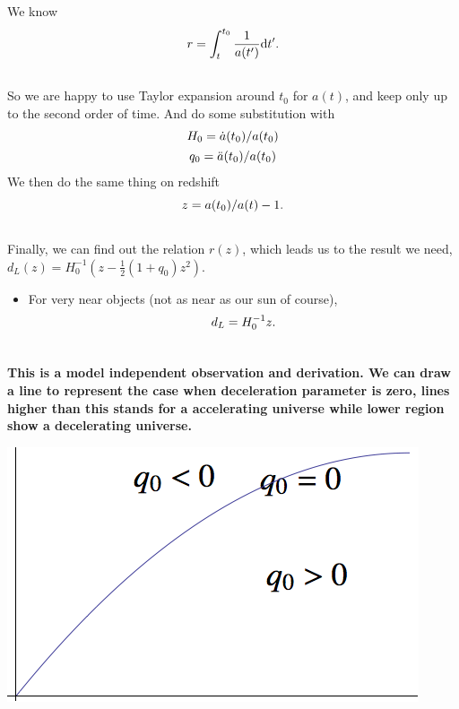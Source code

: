\documentclass[letterpaper,10pt,english]{sphinxmanual}
\begin{document}
We know
\begin{gather}
\begin{split}r = \int_t^{t_0} \frac{1}{a(t')} \mathrm d t' .\end{split}\notag\\\begin{split}\end{split}\notag
\end{gather}
So we are happy to use Taylor expansion around $t_0$ for $a(t)$, and keep only up to the second order of time. And do some substitution with
\begin{gather}
\begin{split}H_0 = \dot a(t_0)/a(t_0)\end{split}\notag\\\begin{split}q_0=\ddot a (t_0) / a(t_0)\end{split}\notag
\end{gather}
We then do the same thing on redshift
\begin{gather}
\begin{split}z=a(t_0)/a(t) - 1 .\end{split}\notag\\\begin{split}\end{split}\notag
\end{gather}
Finally, we can find out the relation $r(z)$, which leads us to the result we need, $d_L(z) = H_0^{-1} (z - \frac12 (1+q_0) z^2)$.
\begin{itemize}
\item {} 
For very near objects (not as near as our sun of course),
\begin{gather}
\begin{split}d_L = H_0^{-1}z .\end{split}\notag\\\begin{split}\end{split}\notag
\end{gather}
\end{itemize}

\textbf{This is a model independent observation and derivation. We can draw a line to represent the case when deceleration parameter is zero, lines higher than this stands for a accelerating universe while lower region show a decelerating universe.}

\includegraphics{LuminosityDistanceVSRedshift.png}
\end{document}

